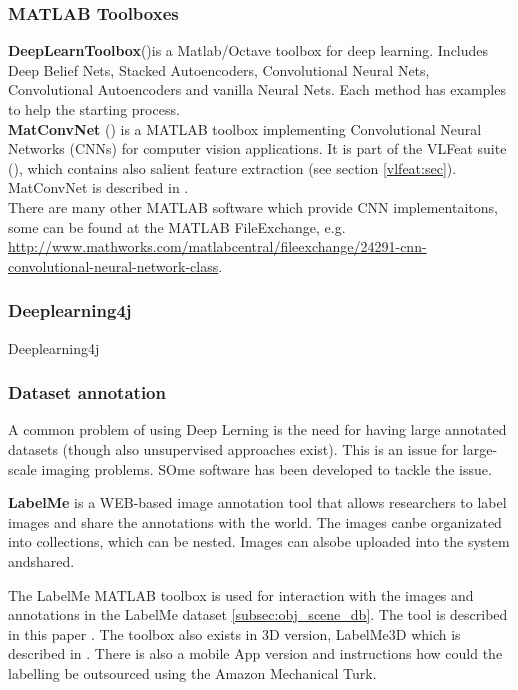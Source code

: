 \subsubsection{MATLAB Toolboxes}
{\bf DeepLearnToolbox}(\cite{deeplearntoolbox_soft})is a Matlab/Octave toolbox for deep learning. Includes Deep Belief Nets, Stacked Autoencoders, Convolutional Neural Nets, Convolutional Autoencoders and vanilla Neural Nets. Each method has examples to help the starting process.\\
{\bf MatConvNet} (\cite{matconvnet_soft}) is a MATLAB toolbox implementing Convolutional Neural Networks (CNNs) for computer vision applications. It is part of the VLFeat suite (\cite{vlfeat_soft}), which contains also salient feature extraction (see section \ref{vlfeat:sec}). MatConvNet is described in \cite{matconvnet_paper}.\\
 There are many other MATLAB software which provide CNN implementaitons, some can be found at the MATLAB FileExchange, e.g. \url{http://www.mathworks.com/matlabcentral/fileexchange/24291-cnn-convolutional-neural-network-class}.

\subsubsection{Deeplearning4j}
Deeplearning4j 

\subsubsection{Dataset annotation}\label{subsec:dbannot}
A common problem of using Deep Lerning is the need for having large annotated datasets (though also unsupervised approaches exist). This is an issue for large-scale imaging problems. SOme software has been developed to tackle the issue.

{\bf LabelMe} is a WEB-based image annotation tool that allows researchers to label images and share the annotations with the world. The images canbe organizated into collections, which can be nested. Images can alsobe uploaded into the system andshared.

The LabelMe MATLAB toolbox is used for interaction with the images and annotations in the LabelMe dataset \ref{subsec:obj_scene_db}. The tool is described in this paper
\cite{Russell2008}. The toolbox also exists in 3D version, LabelMe3D which is described in \cite{Russell2009}. There is also a mobile App version and instructions how could the labelling be outsourced using the Amazon Mechanical Turk.
